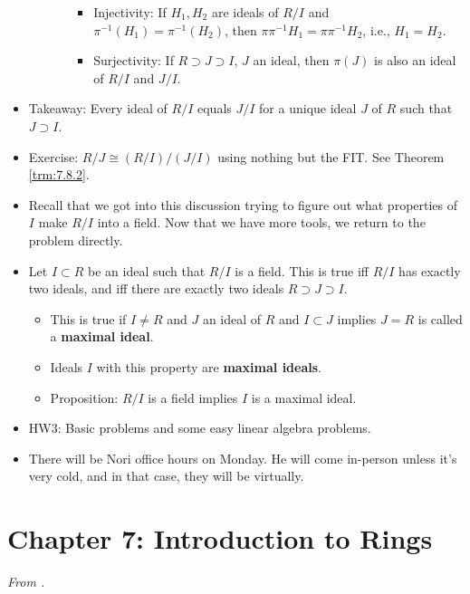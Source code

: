 \documentclass[../notes.tex]{subfiles}
\begin{document}
\begin{itemize}
\begin{itemize}
\begin{enumerate}[label={(\alph*)}]
\begin{itemize}
                \item Injectivity: If $H_1,H_2$ are ideals of $R/I$ and $\pi^{-1}(H_1)=\pi^{-1}(H_2)$, then $\pi\pi^{-1}H_1=\pi\pi^{-1}H_2$, i.e., $H_1=H_2$.
                \item Surjectivity: If $R\supset J\supset I$, $J$ an ideal, then $\pi(J)$ is also an ideal of $R/I$ and $J/I$.
            \end{itemize}
        \end{enumerate}
    \end{itemize}
    \item Takeaway: Every ideal of $R/I$ equals $J/I$ for a unique ideal $J$ of $R$ such that $J\supset I$.
    \item Exercise: $R/J\cong (R/I)/(J/I)$ using nothing but the FIT. See Theorem \ref{trm:7.8.2}.
    \item Recall that we got into this discussion trying to figure out what properties of $I$ make $R/I$ into a field. Now that we have more tools, we return to the problem directly.
    \item Let $I\subset R$ be an ideal such that $R/I$ is a field. This is true iff $R/I$ has exactly two ideals, and iff there are exactly two ideals $R\supset J\supset I$.
    \begin{itemize}
        \item This is true if $I\neq R$ and $J$ an ideal of $R$ and $I\subset J$ implies $J=R$ is called a \textbf{maximal ideal}.
        \item Ideals $I$ with this property are \textbf{maximal ideals}.
        \item Proposition: $R/I$ is a field implies $I$ is a maximal ideal.
    \end{itemize}
    \item HW3: Basic problems and some easy linear algebra problems.
    \item There will be Nori office hours on Monday. He will come in-person unless it's very cold, and in that case, they will be virtually.
\end{itemize}



\section{Chapter 7: Introduction to Rings}
\emph{From \textcite{bib:DummitFoote}.}
\end{document}
